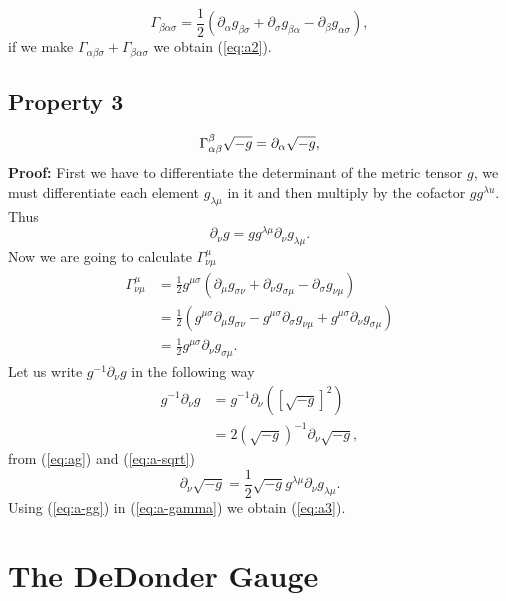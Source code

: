\begin{appendix}
\[
\Gamma_{\beta\alpha\sigma}=\frac{1}{2}\left(\partial_{\alpha}g_{\beta\sigma}+\partial_{\sigma}g_{\beta\alpha}-\partial_{\beta}g_{\alpha\sigma}\right),
\]
if we make $\Gamma_{\alpha\beta\sigma}+\Gamma_{\beta\alpha\sigma}$
we obtain (\ref{eq:a2}).

\subsection*{Property 3}

\begin{equation}
\Gamma_{\alpha\beta}^{\beta}\sqrt{-g}=\partial_{\text{\ensuremath{\alpha}}}\sqrt{-g},\label{eq:a3}
\end{equation}
\textbf{Proof: }First we have to differentiate the determinant of
the metric tensor $g$, we must differentiate each element $g_{\lambda\mu}$
in it and then multiply by the cofactor $gg^{\lambda u}$. Thus
\begin{equation}
\partial_{\nu}g=gg^{\lambda\mu}\partial_{\nu}g_{\lambda\mu}.\label{eq:ag}
\end{equation}
Now we are going to calculate $\Gamma_{\nu\mu}^{\mu}$
\begin{align}
\Gamma_{\nu\mu}^{\mu} & =\frac{1}{2}g^{\mu\sigma}\left(\partial_{\mu}g_{\sigma\nu}+\partial_{\nu}g_{\sigma\mu}-\partial_{\sigma}g_{\nu\mu}\right)\\
\  & =\frac{1}{2}\left(g^{\mu\sigma}\partial_{\mu}g_{\sigma\nu}-g^{\mu\sigma}\partial_{\sigma}g_{\nu\mu}+g^{\mu\sigma}\partial_{\nu}g_{\sigma\mu}\right)\\
\  & =\frac{1}{2}g^{\mu\sigma}\partial_{\nu}g_{\sigma\mu}.\label{eq:a-gamma}
\end{align}
Let us write $g^{-1}\partial_{\nu}g$ in the following way
\begin{align}
g^{-1}\partial_{\nu}g & =g^{-1}\partial_{\nu}\left(\left[\sqrt{-g}\right]^{2}\right)\nonumber \\
\  & =2\left(\sqrt{-g}\right)^{-1}\partial_{\nu}\sqrt{-g},\label{eq:a-sqrt}
\end{align}
from (\ref{eq:ag}) and (\ref{eq:a-sqrt})
\begin{equation}
\partial_{\nu}\sqrt{-g}=\frac{1}{2}\sqrt{-g}g^{\lambda\mu}\partial_{\nu}g_{\lambda\mu}.\label{eq:a-gg}
\end{equation}
Using (\ref{eq:a-gg}) in (\ref{eq:a-gamma}) we obtain (\ref{eq:a3}).

\section{The DeDonder Gauge}


\end{appendix}
